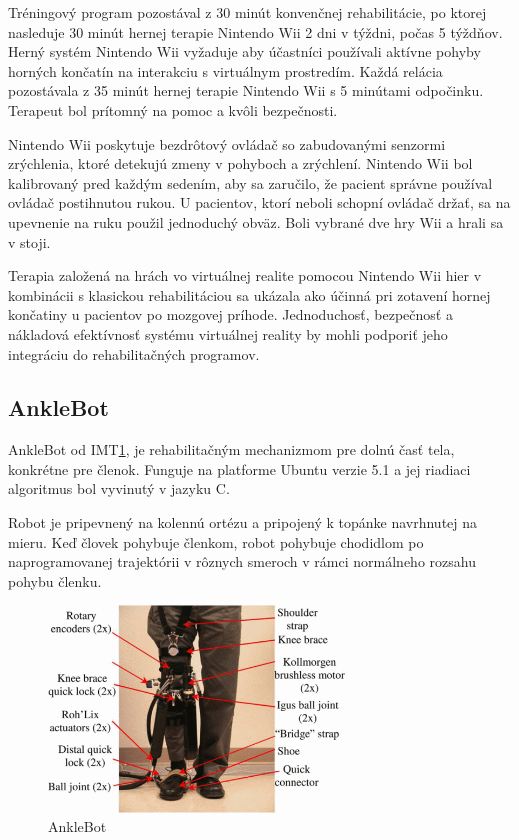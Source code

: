 \documentclass[10pt,twoside,slovak,a4paper]{article}
\begin{document}
Tréningový program pozostával z 30 minút konvenčnej rehabilitácie, po ktorej nasleduje 30 minút hernej terapie Nintendo Wii 2 dni v týždni, počas 5 týždňov. Herný systém Nintendo Wii vyžaduje aby účastníci používali aktívne pohyby horných končatín na interakciu s virtuálnym prostredím. Každá relácia pozostávala z 35 minút hernej terapie Nintendo Wii s 5 minútami odpočinku. Terapeut bol prítomný na pomoc a kvôli bezpečnosti.

Nintendo Wii poskytuje bezdrôtový ovládač so zabudovanými senzormi zrýchlenia, ktoré detekujú zmeny v pohyboch a zrýchlení. Nintendo Wii bol kalibrovaný pred každým sedením, aby sa zaručilo, že pacient správne používal ovládač postihnutou rukou. U pacientov, ktorí neboli schopní ovládač držať, sa na upevnenie na ruku použil jednoduchý obväz. Boli vybrané dve hry Wii a hrali sa v stoji. 

Terapia založená na hrách vo virtuálnej realite pomocou Nintendo Wii hier v kombinácii s klasickou rehabilitáciou sa ukázala ako účinná pri zotavení hornej končatiny u pacientov po mozgovej príhode. Jednoduchosť, bezpečnosť a nákladová efektívnosť systému virtuálnej reality by mohli podporiť jeho integráciu do rehabilitačných programov.

\subsection{AnkleBot}\cite{7523762}
AnkleBot od IMT\ref{fig:anklebot}, je rehabilitačným mechanizmom pre dolnú časť tela, konkrétne pre členok. Funguje na platforme Ubuntu verzie 5.1 a jej riadiaci algoritmus bol vyvinutý v jazyku C. 

Robot je pripevnený na kolennú ortézu a pripojený k topánke navrhnutej na mieru. Keď človek pohybuje členkom, robot pohybuje chodidlom po naprogramovanej trajektórii v rôznych smeroch v rámci normálneho rozsahu pohybu členku.

\begin{figure}
    \centering
    \includegraphics[width = 0.7\textwidth]{obrazky/AnkleBot.png}
    \caption{AnkleBot}
    \label{fig:anklebot}
\end{figure}
\end{document}
